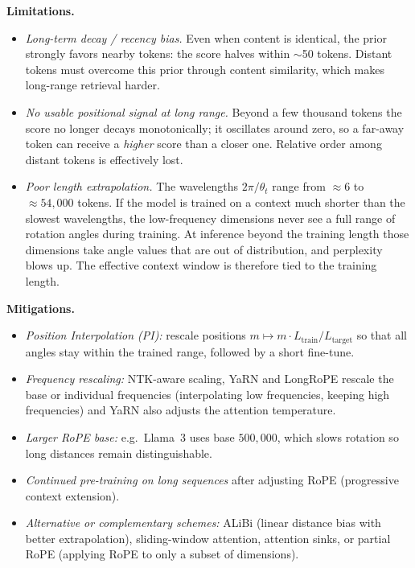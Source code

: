 \documentclass[11pt]{article}
\begin{document}
\textbf{Limitations.}
\begin{itemize}[leftmargin=1.5em]
\item \emph{Long-term decay / recency bias.} Even when content is identical, the prior strongly favors nearby tokens: the score halves within $\sim$50 tokens. Distant tokens must overcome this prior through content similarity, which makes long-range retrieval harder.
\item \emph{No usable positional signal at long range.} Beyond a few thousand tokens the score no longer decays monotonically; it oscillates around zero, so a far-away token can receive a \emph{higher} score than a closer one. Relative order among distant tokens is effectively lost.
\item \emph{Poor length extrapolation.} The wavelengths $2\pi/\theta_t$ range from $\approx 6$ to $\approx 54{,}000$ tokens. If the model is trained on a context much shorter than the slowest wavelengths, the low-frequency dimensions never see a full range of rotation angles during training. At inference beyond the training length those dimensions take angle values that are out of distribution, and perplexity blows up. The effective context window is therefore tied to the training length.
\end{itemize}

\textbf{Mitigations.}
\begin{itemize}[leftmargin=1.5em]
\item \emph{Position Interpolation (PI):} rescale positions $m\mapsto m\cdot L_{\text{train}}/L_{\text{target}}$ so that all angles stay within the trained range, followed by a short fine-tune.
\item \emph{Frequency rescaling:} NTK-aware scaling, YaRN and LongRoPE rescale the base or individual frequencies (interpolating low frequencies, keeping high frequencies) and YaRN also adjusts the attention temperature.
\item \emph{Larger RoPE base:} e.g.\ Llama~3 uses base $500{,}000$, which slows rotation so long distances remain distinguishable.
\item \emph{Continued pre-training on long sequences} after adjusting RoPE (progressive context extension).
\item \emph{Alternative or complementary schemes:} ALiBi (linear distance bias with better extrapolation), sliding-window attention, attention sinks, or partial RoPE (applying RoPE to only a subset of dimensions).
\end{itemize}
\end{document}
